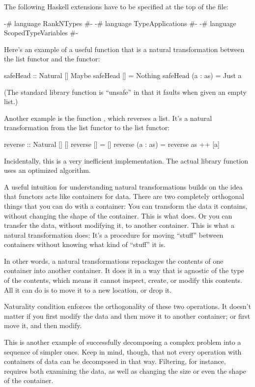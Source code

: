 \documentclass[DaoFP]{subfiles}
\begin{document}
The following Haskell extensions have to be specified at the top of the file:
\begin{haskell}
{-# language RankNTypes #-}
{-# language TypeApplications #-}
{-# language ScopedTypeVariables #-}
\end{haskell}

Here's an example of a useful function that is a natural transformation between the list functor and the  functor:
\begin{haskell}
safeHead :: Natural [] Maybe
safeHead [] = Nothing
safeHead (a : as) = Just a
\end{haskell}
(The standard library  function is ``unsafe'' in that it faults when given an empty list.)

Another example is the function , which reverses a list. It's a natural transformation from the list functor to the list functor:
\begin{haskell}
reverse :: Natural [] []
reverse [] = []
reverse (a : as) = reverse as ++ [a]
\end{haskell}
Incidentally, this is a very inefficient implementation. The actual library function uses an optimized algorithm.

A useful intuition for understanding natural transformations builds on the idea that functors acts like containers for data. There are two completely orthogonal things that you can do with a container: You can transform the data it contains, without changing the shape of the container. This is what  does. Or you can transfer the data, without modifying it, to another container. This is what a natural transformation does: It's a procedure for moving ``stuff'' between containers without knowing what kind of ``stuff'' it is. 

In other words, a natural transformations repackages the contents of one container into another container. It does it in a way that is agnostic of the type of the contents, which means it cannot inspect, create, or modify this contents. All it can do is to move it to a new location, or drop it. 

Naturality condition enforces the orthogonality of these two operations. It doesn't matter if you first modify the data and then move it to another container; or first move it, and then modify. 

This is another example of successfully decomposing a complex problem into a sequence of simpler ones. Keep in mind, though, that not every operation with containers of data can be decomposed in that way. Filtering, for instance, requires both examining the data, as well as changing the size or even the shape of the container. 
\end{document}
